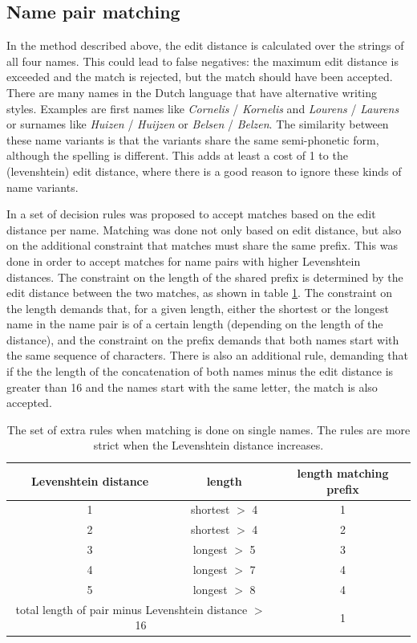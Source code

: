 \subsection{Name pair matching}
\label{sec:name_pair_matching}
In the method described above, the edit distance is calculated over the strings of all four names. This could lead to false negatives: the maximum edit distance is exceeded and the match is rejected, but the match should have been accepted. There are many names in the Dutch language that have alternative writing styles. Examples are first names like \textit{Cornelis} / \textit{Kornelis} and \textit{Lourens} / \textit{Laurens} or surnames like \textit{Huizen} / \textit{Huijzen} or \textit{Belsen} / \textit{Belzen}. 
The similarity between these name variants is that the variants share the same semi-phonetic form, although the spelling is different. This adds at least a cost of 1 to the (levenshtein) edit distance, where there is a good reason to ignore these kinds of name variants. 



In \cite{bloothooft2014learning} a set of decision rules was proposed to accept matches based on the edit distance per name. Matching was done not only based on edit distance, but also on the additional constraint that matches must share the same prefix. This was done in order to accept matches for name pairs with higher Levenshtein distances. The constraint on the length of the shared prefix is determined by the edit distance between the two matches, as shown in table \ref{tab:Ruleset}. The constraint on the length demands that, for a given length, either the shortest or the longest name in the name pair is of a certain length (depending on the length of the distance), and the constraint on the prefix demands that both names start with the same sequence of characters. There is also an additional rule, demanding that if the the length of the concatenation of both names minus the edit distance is greater than 16 and the names start with the same letter, the match is also accepted.

\begin{table}
	\centering
	\caption[Extra rules for name based matching]{\label{tab:Ruleset} The set of extra rules when matching is done on single names. The rules are more strict when the Levenshtein distance increases. }
	\vspace{0.5cm}
	\begin{tabular}{ccc}
		\toprule
		Levenshtein distance & length & length matching prefix \\
		\midrule
		1 & shortest $>$ 4 & 1 \\
		2 & shortest $>$ 4 & 2 \\
		3 & longest $>$ 5 & 3 \\
		4 & longest $>$ 7 & 4 \\
		5 & longest $>$ 8 & 4 \\
		\midrule
		\multicolumn{2}{c}{total length of pair minus Levenshtein distance $>$ 16} & 1 \\
		\bottomrule
	\end{tabular}
\end{table}

